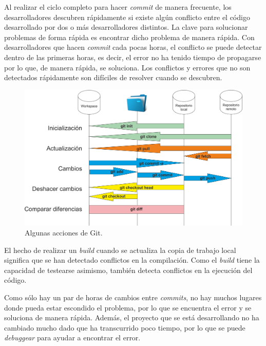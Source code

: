 \begin{enumerate}
Al realizar el ciclo completo para hacer \textit{commit} de manera frecuente, los desarrolladores descubren rápidamente si existe algún conflicto entre el código desarrollado por dos o más desarrolladores distintos. La clave para solucionar problemas de forma rápida es encontrar dicho problema de manera rápida. Con desarrolladores que hacen \textit{commit} cada pocas horas, el conflicto se puede detectar dentro de las primeras horas, es decir, el error no ha tenido tiempo de propagarse por lo que, de manera rápida, se soluciona. Los conflictos y errores que no son detectados rápidamente son difíciles de resolver cuando se descubren.

\begin{figure}[!h]
\centering
   \includegraphics[width=13cm]{Flujo_Git.png}
\caption{Algunas acciones de Git\cite{Git_Manual}.}
\end{figure}

El hecho de realizar un \textit{build} cuando se actualiza la copia de trabajo local significa que se han detectado conflictos en la compilación. Como el \textit{build} tiene la capacidad de testearse asimismo, también detecta conflictos en la ejecución del código.

\clearpage

Como sólo hay un par de horas de cambios entre \textit{commits}, no hay muchos lugares donde pueda estar escondido el problema, por lo que se encuentra el error y se soluciona de manera rápida. Además, el proyecto que se está desarrollando no ha cambiado mucho dado que ha transcurrido poco tiempo, por lo que se puede \textit{debuggear} para ayudar a encontrar el error.



\end{enumerate}
